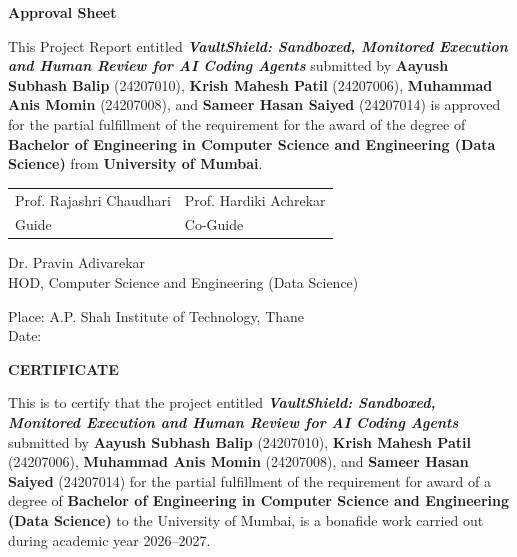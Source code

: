 \documentclass[12pt,a4paper,oneside]{report}
\begin{document}
\thispagestyle{empty}
\vspace*{0.55in}
\begin{center}\large\bfseries Approval Sheet\end{center}
\vspace{0.35in}
\noindent This Project Report entitled \textbf{\textit{VaultShield: Sandboxed, Monitored Execution and Human Review for AI Coding Agents}} submitted by \textbf{Aayush Subhash Balip} (24207010), \textbf{Krish Mahesh Patil} (24207006), \textbf{Muhammad Anis Momin} (24207008), and \textbf{Sameer Hasan Saiyed} (24207014) is approved for the partial fulfillment of the requirement for the award of the degree of \textbf{Bachelor of Engineering in Computer Science and Engineering (Data Science)} from \textbf{University of Mumbai}.\par

\vspace{0.95in}
\noindent\begin{tabularx}{\textwidth}{>{\centering\arraybackslash}X >{\centering\arraybackslash}X}
Prof. Rajashri Chaudhari & Prof. Hardiki Achrekar\\[0.08in]
Guide & Co-Guide
\end{tabularx}

\vspace{1.15in}
\begin{center}
Dr. Pravin Adivarekar\\[0.08in]
HOD, Computer Science and Engineering (Data Science)
\end{center}
\vfill
\noindent Place: A.P. Shah Institute of Technology, Thane\\[0.15in]
Date:
\clearpage

\thispagestyle{empty}
\vspace*{0.55in}
\begin{center}\large\bfseries CERTIFICATE\end{center}
\vspace{0.35in}
\noindent This is to certify that the project entitled \textbf{\textit{VaultShield: Sandboxed, Monitored Execution and Human Review for AI Coding Agents}} submitted by \textbf{Aayush Subhash Balip} (24207010), \textbf{Krish Mahesh Patil} (24207006), \textbf{Muhammad Anis Momin} (24207008), and \textbf{Sameer Hasan Saiyed} (24207014) for the partial fulfillment of the requirement for award of a degree of \textbf{Bachelor of Engineering in Computer Science and Engineering (Data Science)} to the University of Mumbai, is a bonafide work carried out during academic year 2026--2027.\par
\end{document}
